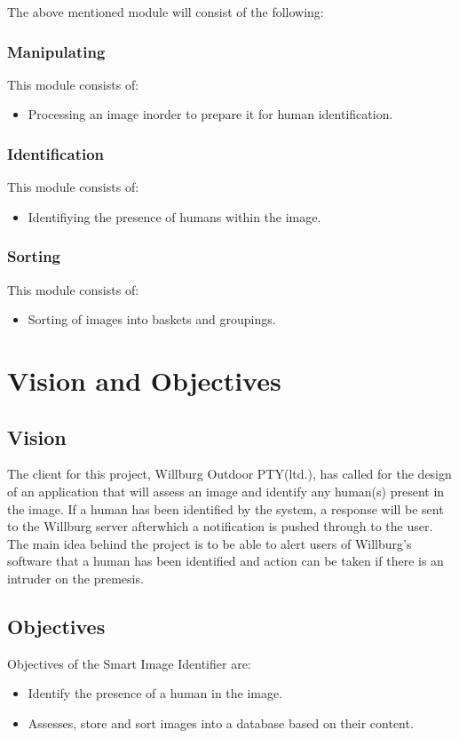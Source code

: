 \documentclass[a4paper,12pt]{report}
\begin{document}
The above mentioned module will consist of the following:
	\subsubsection {Manipulating}
		This module consists of:
			\begin {itemize}
				\item Processing an image inorder to prepare it for human identification.
			\end {itemize}

	\subsubsection {Identification}
		This module consists of:
			\begin {itemize}
				\item Identifiying the presence of humans within the image.
			\end {itemize}

	\subsubsection {Sorting}
		This module consists of:
			\begin {itemize}
				\item Sorting of images into baskets and groupings.
			\end {itemize}


\section {Vision and Objectives}
	\subsection {Vision}
	 The client for this project, Willburg Outdoor PTY(ltd.), has called for the design of an application that will assess an image and identify any human(s) present in the image. If a human has been identified by the system, a response will be sent to the Willburg server afterwhich a notification is pushed through to the user. The main idea behind the project is to be able to alert users of Willburg's software that a human has been identified and action can be taken if there is an intruder on the premesis.

	\subsection {Objectives}
	Objectives of the Smart Image Identifier are:
	\begin {itemize}
		\item Identify the presence of a human in the image.
		\item Assesses, store and sort images into a database based on their content.
	\end {itemize}
\end{document}

